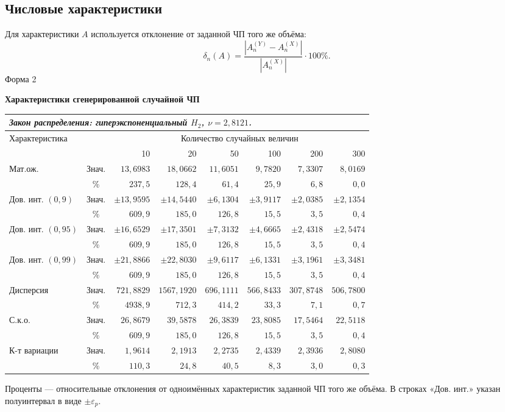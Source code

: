 \documentclass[12pt,a4paper]{article}
\newcommand{\formtitle}[2]{\noindent\hfill Форма #1\par\begin{center}\textbf{#2}\end{center}}
\begin{document}
\subsection{Числовые характеристики}
Для характеристики $A$ используется отклонение от заданной ЧП того же объёма:
\begin{equation}
\delta_n(A)=\frac{|A_n^{(Y)}-A_n^{(X)}|}{|A_n^{(X)}|}\cdot100\%.
\end{equation}
\formtitle{2}{Характеристики сгенерированной случайной ЧП}
\begin{center}\small\setlength{\tabcolsep}{3pt}\renewcommand{\arraystretch}{1.25}
\begin{tabular}{|p{31mm}|c|*{6}{r|}}
\hline
\multicolumn{8}{|l|}{\textit{Закон распределения: гиперэкспоненциальный $H_2$, $\nu=2{,}8121$.}}\\\hline
\multirow{2}{*}{Характеристика}&\multirow{2}{*}{}&\multicolumn{6}{c|}{Количество случайных величин}\\\cline{3-8}
&&10&20&50&100&200&300\\\hline
\multirow{2}{31mm}{Мат.ож.}&Знач.&$13{,}6983$&$18{,}0662$&$11{,}6051$&$9{,}7820$&$7{,}3307$&$8{,}0169$\\\cline{2-8}
&\%&$237{,}5$&$128{,}4$&$61{,}4$&$25{,}9$&$6{,}8$&$0{,}0$\\\hline
\multirow{2}{31mm}{Дов. инт. $(0{,}9)$}&Знач.&$\pm 13{,}9595$&$\pm 14{,}5440$&$\pm 6{,}1304$&$\pm 3{,}9117$&$\pm 2{,}0385$&$\pm 2{,}1354$\\\cline{2-8}
&\%&$609{,}9$&$185{,}0$&$126{,}8$&$15{,}5$&$3{,}5$&$0{,}4$\\\hline
\multirow{2}{31mm}{Дов. инт. $(0{,}95)$}&Знач.&$\pm 16{,}6529$&$\pm 17{,}3501$&$\pm 7{,}3132$&$\pm 4{,}6665$&$\pm 2{,}4318$&$\pm 2{,}5474$\\\cline{2-8}
&\%&$609{,}9$&$185{,}0$&$126{,}8$&$15{,}5$&$3{,}5$&$0{,}4$\\\hline
\multirow{2}{31mm}{Дов. инт. $(0{,}99)$}&Знач.&$\pm 21{,}8866$&$\pm 22{,}8030$&$\pm 9{,}6117$&$\pm 6{,}1331$&$\pm 3{,}1961$&$\pm 3{,}3481$\\\cline{2-8}
&\%&$609{,}9$&$185{,}0$&$126{,}8$&$15{,}5$&$3{,}5$&$0{,}4$\\\hline
\multirow{2}{31mm}{Дисперсия}&Знач.&$721{,}8829$&$1567{,}1920$&$696{,}1111$&$566{,}8433$&$307{,}8748$&$506{,}7800$\\\cline{2-8}
&\%&$4938{,}9$&$712{,}3$&$414{,}2$&$33{,}3$&$7{,}1$&$0{,}7$\\\hline
\multirow{2}{31mm}{С.к.о.}&Знач.&$26{,}8679$&$39{,}5878$&$26{,}3839$&$23{,}8085$&$17{,}5464$&$22{,}5118$\\\cline{2-8}
&\%&$609{,}9$&$185{,}0$&$126{,}8$&$15{,}5$&$3{,}5$&$0{,}4$\\\hline
\multirow{2}{31mm}{К-т вариации}&Знач.&$1{,}9614$&$2{,}1913$&$2{,}2735$&$2{,}4339$&$2{,}3936$&$2{,}8080$\\\cline{2-8}
&\%&$110{,}3$&$24{,}8$&$40{,}5$&$8{,}3$&$3{,}0$&$0{,}3$\\\hline
\end{tabular}
\end{center}
\noindent\small Проценты --- относительные отклонения от одноимённых характеристик заданной ЧП того же объёма. В строках «Дов. инт.» указан полуинтервал в виде $\pm\varepsilon_p$.\normalsize
\end{document}

